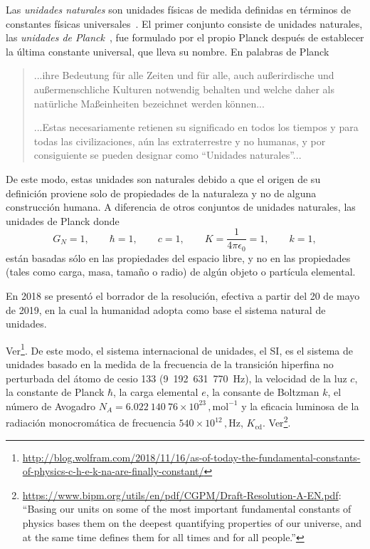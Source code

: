 Las \emph{unidades naturales} son unidades físicas de medida definidas en términos de constantes físicas universales~\cite{NU}. El primer conjunto consiste de unidades naturales, las \emph{unidades de Planck}~\cite{PU},  fue formulado por el propio Planck después de establecer la última constante universal, que lleva su nombre.  En palabras de Planck
\begin{quotation} %

  ...ihre Bedeutung f\"ur alle Zeiten und f\"ur alle, auch au\ss erirdische und au\ss ermenschliche Kulturen notwendig behalten und welche daher als \guillemotright nat\"urliche Ma\ss einheiten bezeichnet werden k\"onnen... %

...Estas necesariamente retienen su significado en todos los tiempos y para todas las civilizaciones, aún las extraterrestre y no humanas, y por consiguiente se pueden designar como ``Unidades naturales''...
\end{quotation} %
De este modo, estas unidades son naturales debido a que el origen de su definición proviene solo de propiedades de la naturaleza y no de alguna construcción humana. A diferencia de otros conjuntos de unidades naturales, las unidades de Planck donde
\begin{equation}
\label{eq:144}
  G_N=1,\qquad \hbar=1,\qquad c=1,\qquad K=\frac{1}{4\pi\epsilon_0}=1,\qquad k=1,
\end{equation}
están basadas sólo en las propiedades del espacio libre, y no en las propiedades (tales como carga, masa, tamaño o radio) de algún objeto o partícula elemental. 
\begin{frame}
En 2018 se presentó el borrador de la resolución, efectiva a partir del 20 de mayo  de 2019, en la cual la humanidad adopta como base el sistema natural de unidades.
\end{frame}
Ver\footnote{\url{http://blog.wolfram.com/2018/11/16/as-of-today-the-fundamental-constants-of-physics-c-h-e-k-na-are-finally-constant/}}. De este modo, el sistema internacional  de unidades, el SI, es el sistema de unidades basado en la medida de la frecuencia de la transición hiperfina no perturbada del átomo de cesio 133 (9~192~631~770~Hz), la velocidad de la luz $c$, la constante de Planck $\hbar$, la carga elemental $e$, la consante de Boltzman $k$, el número de Avogadro $N_A=6.022~140~76\times 10^{23}\,,\text{mol}^{-1}$ y la eficacia luminosa de la radiación monocromática de frecuencia $540\times 10^{12}\,,\text{Hz}$, $K_{\text{cd}}$. Ver\footnote{\url{https://www.bipm.org/utils/en/pdf/CGPM/Draft-Resolution-A-EN.pdf}: ``Basing our units on some of the most important fundamental constants of physics bases them on the deepest quantifying properties of our universe, and at the same time defines them for all times and for all people.''}.

